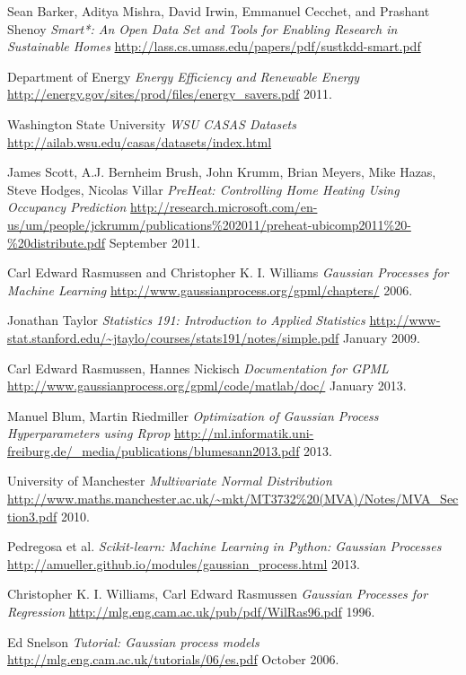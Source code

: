 \documentclass[10.5pt,a4paper,twoside]{report}   %
\begin{document}
\begin{thebibliography}{1}
 Sean Barker, Aditya Mishra, David Irwin, Emmanuel Cecchet, and Prashant Shenoy {\em Smart*: An Open Data Set and Tools for Enabling Research in Sustainable Homes} \url{http://lass.cs.umass.edu/papers/pdf/sustkdd-smart.pdf}

 Department of Energy {\em Energy Efficiency and Renewable Energy} \url{http://energy.gov/sites/prod/files/energy_savers.pdf} 2011.

 Washington State University {\em WSU CASAS Datasets} \url{http://ailab.wsu.edu/casas/datasets/index.html}

 James Scott, A.J. Bernheim Brush, John Krumm, Brian Meyers, Mike Hazas, Steve Hodges, Nicolas Villar {\em PreHeat: Controlling Home Heating Using Occupancy Prediction} \url{http://research.microsoft.com/en-us/um/people/jckrumm/publications\%202011/preheat-ubicomp2011\%20-\%20distribute.pdf} September 2011.


 Carl Edward Rasmussen and Christopher K. I. Williams {\em Gaussian Processes for Machine Learning} \url{http://www.gaussianprocess.org/gpml/chapters/} 2006.

 Jonathan Taylor {\em Statistics 191: Introduction to Applied Statistics} \url{http://www-stat.stanford.edu/~jtaylo/courses/stats191/notes/simple.pdf} January 2009.

 Carl Edward Rasmussen, Hannes Nickisch {\em Documentation for GPML} \url{http://www.gaussianprocess.org/gpml/code/matlab/doc/} January 2013.

 Manuel Blum, Martin Riedmiller {\em Optimization of Gaussian Process Hyperparameters using Rprop} \url{http://ml.informatik.uni-freiburg.de/_media/publications/blumesann2013.pdf} 2013.

 University of Manchester {\em Multivariate Normal Distribution} \url{http://www.maths.manchester.ac.uk/~mkt/MT3732\%20(MVA)/Notes/MVA_Section3.pdf} 2010.

 Pedregosa et al. {\em Scikit-learn: Machine Learning in Python: Gaussian Processes} \url{http://amueller.github.io/modules/gaussian_process.html} 2013.

 Christopher K. I. Williams, Carl Edward Rasmussen {\em Gaussian Processes for Regression} \url{http://mlg.eng.cam.ac.uk/pub/pdf/WilRas96.pdf} 1996.

 Ed Snelson {\em Tutorial: Gaussian process models} \url{http://mlg.eng.cam.ac.uk/tutorials/06/es.pdf} October 2006.


\end{thebibliography}
\end{document}
